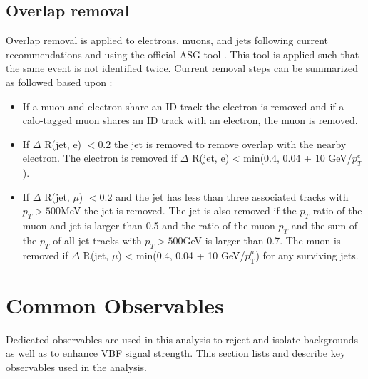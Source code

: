 \subsection{Overlap removal}
Overlap removal is applied to electrons, muons, and jets following current recommendations and using the official ASG tool \cite{Twiki_ASG}. This tool is applied such that the same event is not identified twice. Current removal steps can be summarized as followed based upon \cite{ORpresc,ORpresc_1}:
\begin{itemize}
\item If a muon and electron share an ID track the electron is removed and if a calo-tagged muon shares an ID track with an electron, the muon is removed.
\item If $\Delta$ R(jet, e) $< 0.2$ the jet is removed to remove overlap with the nearby electron. The electron is removed if $\Delta$ R(jet, e) < min(0.4, 0.04 + 10 GeV/$p_T^e$).
\item If $\Delta$ R(jet, $\mu$) $< 0.2$ and the jet has less than three associated tracks with $p_T>500$MeV the jet is removed. The jet is also removed if the $p_T$ ratio of the muon and jet is larger than 0.5 and the ratio of the muon $p_T$ and the sum of the $p_T$ of all jet tracks with $p_T>500$GeV is larger than 0.7. The muon is removed if $\Delta$ R(jet, $\mu$) < min(0.4, 0.04 + 10 GeV/$p_\mathrm{{T}}^{\mu}$) for any surviving jets.
\end{itemize}


\section{Common Observables}

Dedicated observables are used in this analysis to reject and isolate backgrounds as well as to enhance VBF signal strength. This section lists and describe key observables used in the analysis.

